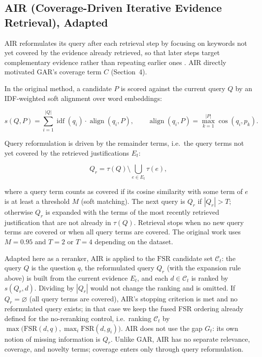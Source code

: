 \documentclass[11pt,a4paper]{article}
\begin{document}
\subsection{AIR (Coverage-Driven Iterative Evidence Retrieval), Adapted}

AIR reformulates its query after each retrieval step by focusing on keywords not yet covered by the evidence already retrieved, so that later steps target complementary evidence rather than repeating earlier ones \citep{yadav-etal-2020-unsupervised}. AIR directly motivated GAR's coverage term $C$ (Section~4).

In the original method, a candidate $P$ is scored against the current query $Q$ by an IDF-weighted soft alignment over word embeddings:

\[
s(Q,P)=\sum_{i=1}^{|Q|}\operatorname{idf}(q_i)\cdot\operatorname{align}(q_i,P),
\qquad
\operatorname{align}(q_i,P)=\max_{k=1}^{|P|}\cos(q_i,p_k).
\]

Query reformulation is driven by the remainder terms, i.e.\ the query terms not yet covered by the retrieved justifications $E_t$:

\[
Q_r=\tau(Q)\setminus\bigcup_{e\in E_t}\tau(e),
\]

where a query term counts as covered if its cosine similarity with some term of $e$ is at least a threshold $M$ (soft matching). The next query is $Q_r$ if $|Q_r|>T$; otherwise $Q_r$ is expanded with the terms of the most recently retrieved justification that are not already in $\tau(Q)$. Retrieval stops when no new query terms are covered or when all query terms are covered. The original work uses $M=0.95$ and $T=2$ or $T=4$ depending on the dataset.

Adapted here as a reranker, AIR is applied to the $\mathrm{FSR}$ candidate set $\mathcal{C}_t$: the query $Q$ is the question $q$, the reformulated query $Q_r$ (with the expansion rule above) is built from the current evidence $E_t$, and each $d\in\mathcal{C}_t$ is ranked by $s(Q_r,d)$. Dividing by $|Q_r|$ would not change the ranking and is omitted. If $Q_r=\varnothing$ (all query terms are covered), AIR's stopping criterion is met and no reformulated query exists; in that case we keep the fused FSR ordering already defined for the no-reranking control, i.e.\ ranking $\mathcal{C}_t$ by $\max\big(\mathrm{FSR}(d,q),\max_i \mathrm{FSR}(d,g_i)\big)$. AIR does not use the gap $G_t$: its own notion of missing information is $Q_r$. Unlike GAR, AIR has no separate relevance, coverage, and novelty terms; coverage enters only through query reformulation.
\end{document}
